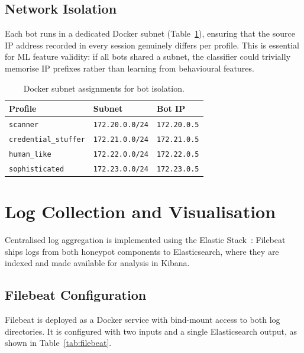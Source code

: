 \subsection{Network Isolation}

Each bot runs in a dedicated Docker subnet (Table~\ref{tab:bot_subnets}),
ensuring that the source IP address recorded in every session genuinely
differs per profile. This is essential for ML feature validity: if all bots
shared a subnet, the classifier could trivially memorise IP prefixes rather than
learning from behavioural features.

\begin{table}[h]
\centering
\caption{Docker subnet assignments for bot isolation.}
\label{tab:bot_subnets}
\begin{tabular}{lll}
\hline
\textbf{Profile} & \textbf{Subnet} & \textbf{Bot IP} \\
\hline
\texttt{scanner}            & \texttt{172.20.0.0/24} & \texttt{172.20.0.5} \\
\texttt{credential\_stuffer} & \texttt{172.21.0.0/24} & \texttt{172.21.0.5} \\
\texttt{human\_like}         & \texttt{172.22.0.0/24} & \texttt{172.22.0.5} \\
\texttt{sophisticated}       & \texttt{172.23.0.0/24} & \texttt{172.23.0.5} \\
\hline
\end{tabular}
\end{table}


\section{Log Collection and Visualisation}
\label{sec:elk}

Centralised log aggregation is implemented using the Elastic
Stack~\cite{Hol06}: Filebeat ships logs from both honeypot components to
Elasticsearch, where they are indexed and made available for analysis in Kibana.

\subsection{Filebeat Configuration}

Filebeat is deployed as a Docker service with bind-mount access to both log
directories. It is configured with two inputs and a single Elasticsearch output,
as shown in Table~\ref{tab:filebeat}.

